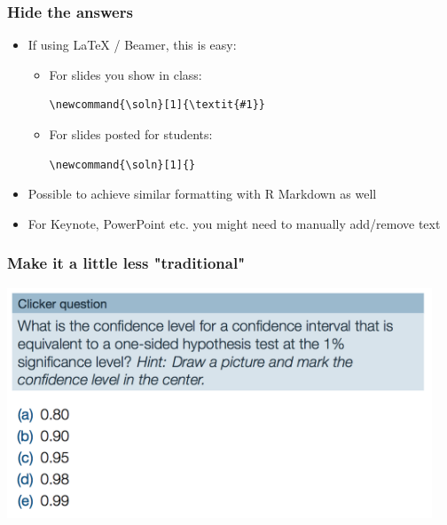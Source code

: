 \documentclass{beamer}
\newcommand{\soln}[1]{}
\begin{document}
\begin{frame}[fragile]
\frametitle{Hide the answers}

\begin{itemize}

\item If using LaTeX / Beamer, this is easy:

\begin{itemize}

\item For slides you show in class:

\begin{verbatim}
\newcommand{\soln}[1]{\textit{#1}}
\end{verbatim}

\soln{I'm on the slides shown in class, but not on the posted slides.}

\item For slides posted for students:

\begin{verbatim}
\newcommand{\soln}[1]{}
\end{verbatim}

\end{itemize}

\pause

\item Possible to achieve similar formatting with R Markdown as well

\pause

\item For Keynote, PowerPoint etc. you might need to manually add/remove text

\end{itemize}


\end{frame}


\begin{frame}
\frametitle{Make it a little less "traditional"}

\begin{center}
\includegraphics[width = 0.95\textwidth]{figures/clicker-question}
\end{center}

\vfill

\end{frame}
\end{document}
